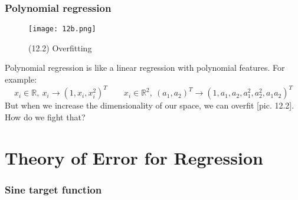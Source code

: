 \subsubsection*{Polynomial regression}

\begin{wrapfigure}{r}{0.25\linewidth}
	\vspace{-2.5cm}
  \begin{center}
    \texttt{[image: 12b.png]}
  \end{center}
  \vspace{-0.8cm}
  \caption*{(12.2) Overfitting}
  \vspace{-2cm}
\end{wrapfigure}
Polynomial regression is like a linear regression with polynomial features. For example:
$$x_i\in\mathbb{R},\ x_i\to(1,x_i,x_i^2)^T \qquad
x_i\in\mathbb{R}^2,\ (a_1, a_2)^T\to(1,a_1,a_2,a_1^2,a_2^2,a_1a_2)^T$$
But when we increase the dimensionality of our space, we can overfit [pic. 12.2]. How do we fight that?

\newpage
\section{Theory of Error for Regression}
\vspace{-0.6cm}
\subsubsection*{Sine target function}

